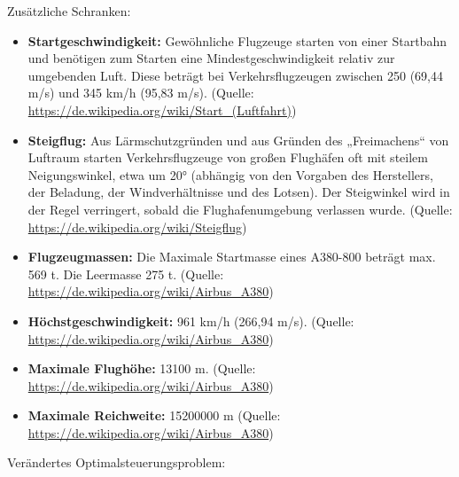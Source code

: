 Zusätzliche Schranken:
\begin{itemize}
\item \textbf{Startgeschwindigkeit:} Gewöhnliche Flugzeuge starten von einer Startbahn und benötigen zum Starten eine Mindestgeschwindigkeit relativ zur umgebenden Luft. Diese beträgt bei Verkehrsflugzeugen zwischen 250 (69,44 m/s) und 345 km/h (95,83 m/s). (Quelle: \url{https://de.wikipedia.org/wiki/Start_(Luftfahrt)})
%
\item \textbf{Steigflug:} Aus Lärmschutzgründen und aus Gründen des „Freimachens“ von Luftraum starten Verkehrsflugzeuge von großen Flughäfen oft mit steilem Neigungswinkel, etwa um 20° (abhängig von den Vorgaben des Herstellers, der Beladung, der Windverhältnisse und des Lotsen). Der Steigwinkel wird in der Regel verringert, sobald die Flughafenumgebung verlassen wurde. (Quelle: \url{https://de.wikipedia.org/wiki/Steigflug})
%
\item \textbf{Flugzeugmassen:} Die Maximale Startmasse eines A380-800 beträgt max. 569 t. Die Leermasse 275 t. (Quelle: \url{https://de.wikipedia.org/wiki/Airbus_A380})
%
\item \textbf{Höchstgeschwindigkeit:} 961 km/h (266,94 m/s). (Quelle: \url{https://de.wikipedia.org/wiki/Airbus_A380})
%
\item \textbf{Maximale Flughöhe:} 13100 m. (Quelle: \url{https://de.wikipedia.org/wiki/Airbus_A380})
%
\item \textbf{Maximale Reichweite:} 15200000 m (Quelle: \url{https://de.wikipedia.org/wiki/Airbus_A380})
\end{itemize}
Verändertes Optimalsteuerungsproblem:
